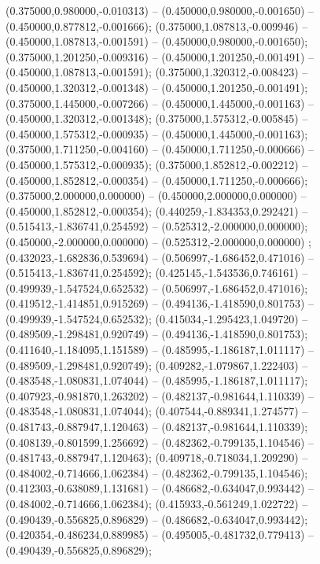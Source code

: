  (0.375000,0.980000,-0.010313) -- (0.450000,0.980000,-0.001650) -- (0.450000,0.877812,-0.001666);
 (0.375000,1.087813,-0.009946) -- (0.450000,1.087813,-0.001591) -- (0.450000,0.980000,-0.001650);
 (0.375000,1.201250,-0.009316) -- (0.450000,1.201250,-0.001491) -- (0.450000,1.087813,-0.001591);
 (0.375000,1.320312,-0.008423) -- (0.450000,1.320312,-0.001348) -- (0.450000,1.201250,-0.001491);
 (0.375000,1.445000,-0.007266) -- (0.450000,1.445000,-0.001163) -- (0.450000,1.320312,-0.001348);
 (0.375000,1.575312,-0.005845) -- (0.450000,1.575312,-0.000935) -- (0.450000,1.445000,-0.001163);
 (0.375000,1.711250,-0.004160) -- (0.450000,1.711250,-0.000666) -- (0.450000,1.575312,-0.000935);
 (0.375000,1.852812,-0.002212) -- (0.450000,1.852812,-0.000354) -- (0.450000,1.711250,-0.000666);
 (0.375000,2.000000,0.000000) -- (0.450000,2.000000,0.000000) -- (0.450000,1.852812,-0.000354);
 (0.440259,-1.834353,0.292421) -- (0.515413,-1.836741,0.254592) -- (0.525312,-2.000000,0.000000);
 (0.450000,-2.000000,0.000000) -- (0.525312,-2.000000,0.000000) ;
 (0.432023,-1.682836,0.539694) -- (0.506997,-1.686452,0.471016) -- (0.515413,-1.836741,0.254592);
 (0.425145,-1.543536,0.746161) -- (0.499939,-1.547524,0.652532) -- (0.506997,-1.686452,0.471016);
 (0.419512,-1.414851,0.915269) -- (0.494136,-1.418590,0.801753) -- (0.499939,-1.547524,0.652532);
 (0.415034,-1.295423,1.049720) -- (0.489509,-1.298481,0.920749) -- (0.494136,-1.418590,0.801753);
 (0.411640,-1.184095,1.151589) -- (0.485995,-1.186187,1.011117) -- (0.489509,-1.298481,0.920749);
 (0.409282,-1.079867,1.222403) -- (0.483548,-1.080831,1.074044) -- (0.485995,-1.186187,1.011117);
 (0.407923,-0.981870,1.263202) -- (0.482137,-0.981644,1.110339) -- (0.483548,-1.080831,1.074044);
 (0.407544,-0.889341,1.274577) -- (0.481743,-0.887947,1.120463) -- (0.482137,-0.981644,1.110339);
 (0.408139,-0.801599,1.256692) -- (0.482362,-0.799135,1.104546) -- (0.481743,-0.887947,1.120463);
 (0.409718,-0.718034,1.209290) -- (0.484002,-0.714666,1.062384) -- (0.482362,-0.799135,1.104546);
 (0.412303,-0.638089,1.131681) -- (0.486682,-0.634047,0.993442) -- (0.484002,-0.714666,1.062384);
 (0.415933,-0.561249,1.022722) -- (0.490439,-0.556825,0.896829) -- (0.486682,-0.634047,0.993442);
 (0.420354,-0.486234,0.889985) -- (0.495005,-0.481732,0.779413) -- (0.490439,-0.556825,0.896829);
